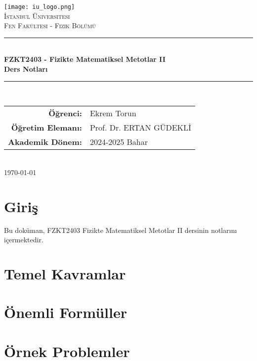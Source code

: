 \documentclass[12pt,a4paper]{article}
\begin{document}
\begin{titlepage}
    \centering
    \texttt{[image: iu\_logo.png]}\\[1cm]
    {\scshape\LARGE İstanbul Üniversitesi\\}
    {\scshape\Large Fen Fakültesi - Fizik Bölümü\\[0.5cm]}
    \rule{\linewidth}{0.2mm} \\[0.4cm]
    { \huge \bfseries FZKT2403 - Fizikte Matematiksel Metotlar II\\
    Ders Notları\\[0.4cm] }
    \rule{\linewidth}{0.2mm} \\[1.5cm]
    
    {\large
    \begin{tabular}{rl}
        \textbf{Öğrenci:} & Ekrem Torun \\
        \textbf{Öğretim Elemanı:} & Prof. Dr. ERTAN GÜDEKLİ \\
        \textbf{Akademik Dönem:} & 2024-2025 Bahar \\
    \end{tabular}}\\[2cm]
    
    {\large \today}
\end{titlepage}

\tableofcontents
\newpage

\section{Giriş}
Bu doküman, FZKT2403 Fizikte Matematiksel Metotlar II dersinin notlarını içermektedir.

\section{Temel Kavramlar}

\section{Önemli Formüller}

\section{Örnek Problemler}
\end{document}
